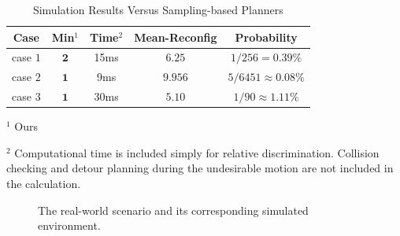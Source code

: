 \documentclass[letterpaper, 10 pt, conference]{ieeeconf}  %
\begin{document}
\begin{table}[t]
\centering
\caption{Simulation Results Versus Sampling-based Planners}\label{table:comparison}
\begin{tabular}{c|c|c|c|c}
\hline
Case & Min$^1$ & Time$^2$& Mean-Reconfig& Probability \\
\hline
\hline
case $1$ & $\mathbf{2}$ & 15ms & $6.25$ & $1/256=0.39\%$\\
\hline 
case $2$ & $\mathbf{1}$ & 9ms& $9.956$ & $5/6451\approx0.08\%$\\
\hline
case $3$ & $\mathbf{1}$ & 30ms& $5.10$ & $1/90\approx 1.11\%$\\
\hline
\end{tabular}
\begin{tablenotes}
\item $^1$ Ours
\item $^2$ Computational time is included simply for relative discrimination. Collision checking and detour planning during the undesirable motion are not included in the calculation. 
\end{tablenotes}
\end{table}

\begin{figure}[t]
\centering
{}
\caption{The real-world scenario and its corresponding simulated environment. }\label{fig:realworld_illustration}
\end{figure}
\end{document}
